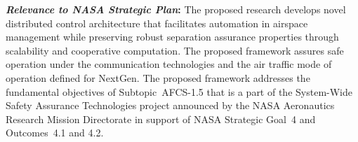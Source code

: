 \documentclass[letter,onecolumn,12pt]{aiaa-tc}
\newcommand{\1}{1_n}
\begin{document}

\medskip

\textbf{\emph{Relevance to NASA Strategic Plan}:} The proposed research develops novel distributed control
architecture that facilitates automation in airspace management while preserving robust separation assurance
properties through scalability and cooperative computation. The proposed framework  assures safe operation under the communication technologies  and the air traffic mode of operation defined for NextGen.
The proposed framework addresses the fundamental objectives of Subtopic~\mbox{AFCS-1.5} that is a part of the System-Wide Safety Assurance Technologies project  announced by the NASA Aeronautics Research Mission Directorate in support of NASA Strategic Goal~4 and Outcomes~4.1 and 4.2.




\clearpage
\thispagestyle{empty}
\tableofcontents



\clearpage
\pagestyle{plain}

\end{document}
